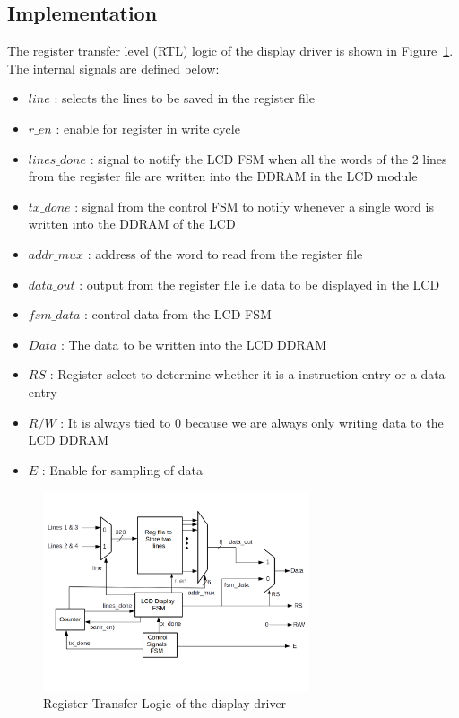 \documentclass[a4paper]{article}
\begin{document}
\subsection{Implementation}
The register transfer level (RTL) logic of the display driver is shown in Figure~\ref{fig:RTL}. The internal signals are defined below:
\begin{itemize}
	\item $line$ : selects the lines to be saved in the register file
	\item $r\_en$ :  enable for register in write cycle
	\item $lines\_done$ : signal to notify the LCD FSM when all the words of the 2 lines from the register file are written into the DDRAM in the LCD module
	\item $tx\_done$ : signal from the control FSM to notify whenever a single word is written into the DDRAM of the LCD
	\item $addr\_mux$ : address of the word to read from the register file
	\item $data\_out$ : output from the register file i.e data to be displayed in the LCD
	\item $fsm\_data$ : control data from the LCD FSM
	\item $Data$ : The data to be written into the LCD DDRAM
	\item $RS$ : Register select to determine whether it is a instruction entry or a data entry
	\item $R/W$ : It is always tied to 0 because we are always only writing data to the LCD DDRAM 
	\item $E$ : Enable for sampling of data 
\end{itemize}

\begin{figure}[h!]
  \begin{center}
    \includegraphics[width=0.7\textwidth]{RTL1.png}
    \caption{Register Transfer Logic of the display driver}
    \label{fig:RTL}
  \end{center}
\end{figure}
 
\end{document}
